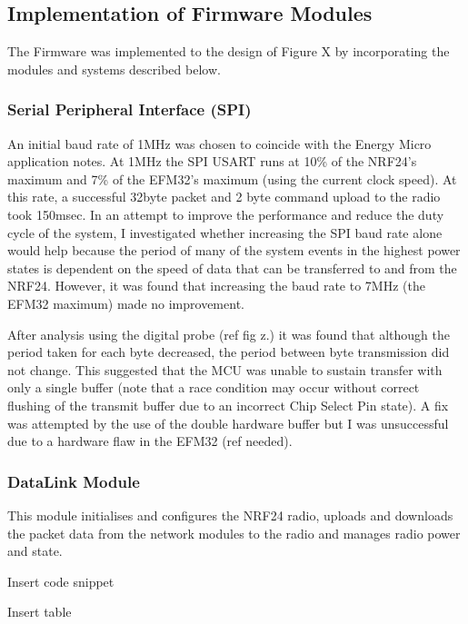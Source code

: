 \subsection{Implementation of Firmware Modules}
The Firmware was implemented to the design of Figure X by incorporating the modules and systems
described below.

\subsubsection{Serial Peripheral Interface (SPI)}
An initial baud rate of 1MHz was chosen to coincide with the Energy Micro application notes. At
1MHz the SPI USART runs at 10\% of the NRF24’s maximum and 7\% of the EFM32’s maximum (using
the current clock speed). At this rate, a successful 32byte packet and 2 byte command upload to the
radio took 150msec. In an attempt to improve the performance and reduce the duty cycle of the
system, I investigated whether increasing the SPI baud rate alone would help because the period of
many of the system events in the highest power states is dependent on the speed of data that can
be transferred to and from the NRF24. However, it was found that increasing the baud rate to 7MHz
(the EFM32 maximum) made no improvement.

After analysis using the digital probe (ref fig z.) it was found that although the period taken for each
byte decreased, the period between byte transmission did not change. This suggested that the MCU
was unable to sustain transfer with only a single buffer (note that a race condition may occur
without correct flushing of the transmit buffer due to an incorrect Chip Select Pin state). A fix was
attempted by the use of the double hardware buffer but I was unsuccessful due to a hardware flaw
in the EFM32 (ref needed).


\subsubsection{DataLink Module}
This module initialises and configures the NRF24 radio, uploads and downloads the packet data from
the network modules to the radio and manages radio power and state.


Insert code snippet


Insert table


